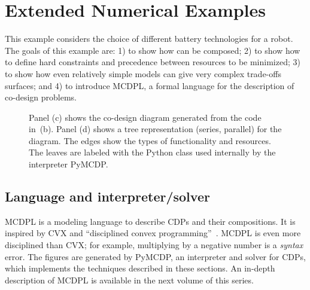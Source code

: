 
\section{Extended Numerical Examples}
\label{sec:Numerical-examples}

This example considers the choice of different battery technologies for a robot.
The goals of this example are:
1) to show how  can be composed;
2) to show how to define hard constraints and precedence between resources to be minimized;
3) to show how even relatively simple models can give very complex trade-offs surfaces;
and 4) to introduce MCDPL, a formal language for the description of co-design problems.

\begin{figure*}[p]
    \centering
    \medskip{}

    \par

    \caption{Panel (c) shows the co-design diagram generated from the code in~(b).
        Panel (d) shows a tree representation (series, parallel) for the diagram.
        The edges show the types of functionality and resources.
        The leaves are labeled with the Python class used internally by the interpreter PyMCDP.
    }
\end{figure*}

\subsection{Language and interpreter/solver}

MCDPL is a modeling language to describe CDPs and their compositions.
It is inspired by CVX and ``disciplined convex programming''~\cite{grant08graph}.
MCDPL is even more disciplined than CVX; for example, multiplying by a negative number is a \emph{syntax} error.
The figures are generated by PyMCDP, an interpreter and solver for CDPs, which implements the techniques described in these sections.
An in-depth description of MCDPL is available in the next volume of this series.

